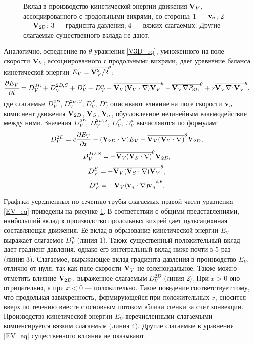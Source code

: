 \begin{figure}
\caption{Вклад в производство кинетической энергии движения $\mathbf{V}_V$, ассоциированного с продольными вихрями, со стороны: 1 --- $\mathbf{v}_n$; 2 --- $\mathbf{V}_{2D}$; 3 --- градиента давления; 4 --- вязких слагаемых. Другие слагаемые существенного вклада не дают.}
\label{ev_parts_pic}
\end{figure}

Аналогично, осреднение по $\theta$ уравнения \eqref{V3D_eq}, умноженного на поле скорости $\mathbf{V}_V$, ассоциированного с продольными вихрями, дает уравнение баланса кинетической энергии $E_V = \overline{\mathbf{V}_V^2/2}^\theta$:
\begin{equation}\label{EV_eq}
\frac{\partial E_V}{\partial t} = D_V^{2D} + D_V^{2D,S} + D_V^{S} + D_V^n - \overline{\mathbf{V}_V (\mathbf{V}_V \cdot \nabla) \mathbf{V}_V}^\theta - \overline{\mathbf{V}_V \nabla P_{3D}}^\theta + \nu \overline{\mathbf{V}_V \nabla^2 \mathbf{V}_V}^\theta,
\end{equation}
где слагаемые $D_V^{2D}$, $D_V^{2D,S}$, $D_V^S$, $D_V^n$ описывают влияние на поле скорости $\mathbf{v}_n$ компонент движения $\mathbf{V}_{2D}$, $\mathbf{V}_S$, $\mathbf{V}_n$, обусловленное нелинейным взаимодействие между ними. Значения $D_V^{2D}$, $D_V^{2D,S}$, $D_V^S$, $D_V^n$ вычисляются по формулам:
$$
D_V^{2D} = c \frac{\partial E_V}{\partial x} - (\mathbf{V}_{2D} \cdot \nabla) E_V - \overline{\mathbf{V}_V (\mathbf{V}_V \cdot \nabla)}^\theta \mathbf{V}_{2D},
$$
$$
D_V^{2D,S} = - \overline{\mathbf{V}_V (\mathbf{V}_S \cdot \nabla)}^\theta \mathbf{V}_{2D},
$$
$$
D_V^{S} = - \overline{\mathbf{V}_V (\mathbf{V}_S \cdot \nabla) \mathbf{V}_V}^\theta,
$$
$$
D_V^n = - \overline{\mathbf{V}_V (\mathbf{v}_n \cdot \nabla) \mathbf{v}_n}^{t,\theta}.
$$

Графики усредненных по сечению трубы слагаемых правой части уравнения \eqref{EV_eq} приведены на рисунке \ref{ev_parts_pic}. В соответствии с общими представлениями, наибольший вклад в производство продольных вихрей дает пульсационная составляющая движения. Её вклад в образование кинетической энергии $E_V$ выражает слагаемое $D_V^n$ (линия 1). Также существенный положительный вклад дает градиент давления, однако его интегральный вклад ниже почти в $5$ раз (линия 3). Слагаемое, выражающее вклад градиента давления в производство $E_V$, отлично от нуля, так как поле скорости $\mathbf{V}_V$ не соленоидальное. Также можно отметить влияние $\mathbf{V}_{2D}$, выраженное слагаемым $D_V^{2D}$ (линия 2). При $x > 0$ оно отрицательно, а при $x < 0$ --- положительно. Такое поведение соответствует тому, что продольная завихренность, формирующейся при положительных $x$, сносится вверх по течению вместе с основным потоком вблизи стенки за счет конвекции. Производство кинетической энергии $E_V$ перечисленными слагаемыми компенсируется вязким слагаемым (линия 4). Другие слагаемые в уравнении \eqref{EV_eq} существенного влияния не оказывают. 

